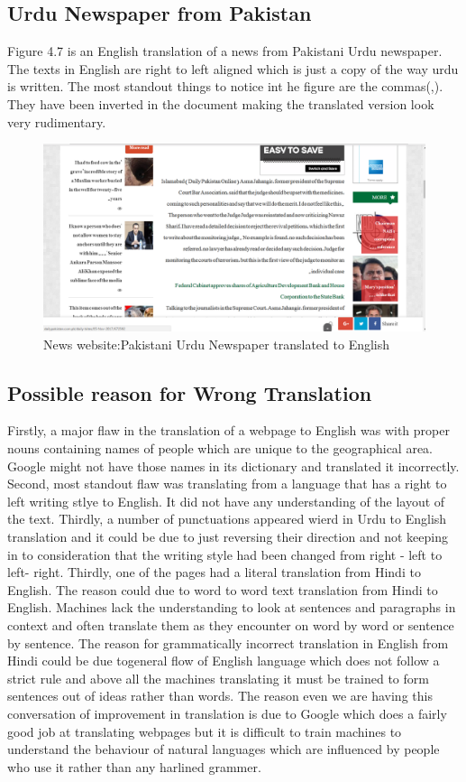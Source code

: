 \documentclass[12pt]{report}
\begin{document}
\subsection{Urdu Newspaper from Pakistan}
Figure 4.7 is an English translation of a news from Pakistani Urdu newspaper. The texts in English are right to left aligned which is just a copy of the way urdu is written. The most standout things to notice int he figure are the commas(,). They have been inverted in the document making the translated version look very rudimentary.
\begin{figure}[ht]
  \centering
  \includegraphics[width=1\textwidth]{Problem6_9/Urdu_newspaper_Pakistan.PNG}
  \caption{News website:Pakistani Urdu Newspaper translated to English}
  \label{fig:8}
\end{figure} 

\subsection{Possible reason for Wrong Translation}
 Firstly, a major flaw in the translation of a webpage to English was with proper nouns containing names of people which are unique to the geographical area. Google might not have those names in its dictionary and translated it incorrectly. Second, most standout flaw was translating from a language that has a right to left writing stlye to English. It did not have any understanding of the layout of the text. Thirdly, a number of punctuations appeared wierd in Urdu to English translation and it could be due to just reversing their direction and not keeping in to consideration that the writing style had been changed from right - left to left- right. Thirdly, one of the pages had a literal translation from Hindi to English. The reason could due to word to word text translation from Hindi to English. Machines lack the understanding to look at sentences and paragraphs in context and often translate them as they encounter on word by word or sentence by sentence. The reason for grammatically incorrect translation in English from Hindi could be due togeneral flow of English language which does not follow a strict rule and above all the machines translating it must be trained to form sentences out of ideas rather than words. The reason even we are having this conversation of improvement in translation is due to Google which does a fairly good job at translating webpages but it is difficult to train machines to understand the behaviour of natural languages which are influenced by people who use it rather than any harlined grammer.
\end{document}
